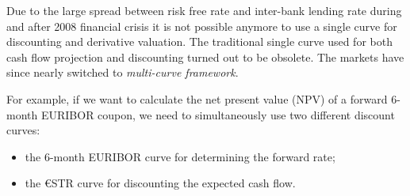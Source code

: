 Due to the large spread between risk free rate and inter-bank lending rate during and after 2008 financial crisis it is not possible anymore to use a single curve for discounting and derivative valuation. The traditional single curve used for both cash flow projection and discounting turned out to be obsolete. The markets have since nearly switched to \emph{multi-curve framework}. 

For example, if we want to calculate the net present value (NPV) of a forward 6-month EURIBOR coupon, we need to simultaneously use two different discount curves: 

\begin{itemize}
\tightlist
\item the 6-month EURIBOR curve for determining the forward rate;
\item the \euro STR curve for discounting the expected cash flow.
\end{itemize}


